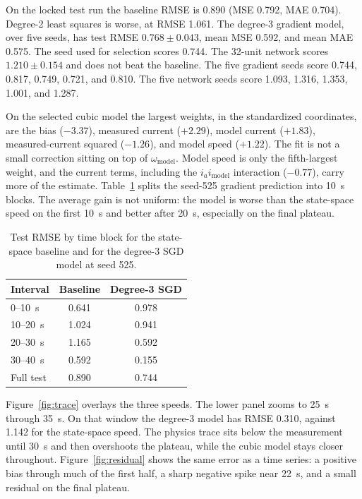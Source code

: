 \documentclass[conference]{IEEEtran}
\begin{document}
On the locked test run the baseline RMSE is 0.890 (MSE 0.792, MAE 0.704). Degree-2 least squares is worse, at RMSE 1.061. The degree-3 gradient model, over five seeds, has test RMSE $0.768 \pm 0.043$, mean MSE 0.592, and mean MAE 0.575. The seed used for selection scores 0.744. The 32-unit network scores $1.210 \pm 0.154$ and does not beat the baseline. The five gradient seeds score 0.744, 0.817, 0.749, 0.721, and 0.810. The five network seeds score 1.093, 1.316, 1.353, 1.001, and 1.287.

On the selected cubic model the largest weights, in the standardized coordinates, are the bias ($-3.37$), measured current ($+2.29$), model current ($+1.83$), measured-current squared ($-1.26$), and model speed ($+1.22$). The fit is not a small correction sitting on top of $\omega_{\mathrm{model}}$. Model speed is only the fifth-largest weight, and the current terms, including the $i_{a} i_{\mathrm{model}}$ interaction ($-0.77$), carry more of the estimate. Table~\ref{tab:time} splits the seed-525 gradient prediction into 10~s blocks. The average gain is not uniform: the model is worse than the state-space speed on the first 10~s and better after 20~s, especially on the final plateau.

\begin{table}[!t]
\caption{Test RMSE by time block for the state-space baseline and for the degree-3 SGD model at seed 525.}
\label{tab:time}
\centering
\begin{tabular}{lcc}
\toprule
Interval & Baseline & Degree-3 SGD \\
\midrule
0--10~s & 0.641 & 0.978 \\
10--20~s & 1.024 & 0.941 \\
20--30~s & 1.165 & 0.592 \\
30--40~s & 0.592 & 0.155 \\
\midrule
Full test & 0.890 & 0.744 \\
\bottomrule
\end{tabular}
\end{table}

Figure~\ref{fig:trace} overlays the three speeds. The lower panel zooms to 25~s through 35~s. On that window the degree-3 model has RMSE 0.310, against 1.142 for the state-space speed. The physics trace sits below the measurement until 30~s and then overshoots the plateau, while the cubic model stays closer throughout. Figure~\ref{fig:residual} shows the same error as a time series: a positive bias through much of the first half, a sharp negative spike near 22~s, and a small residual on the final plateau.
\end{document}
